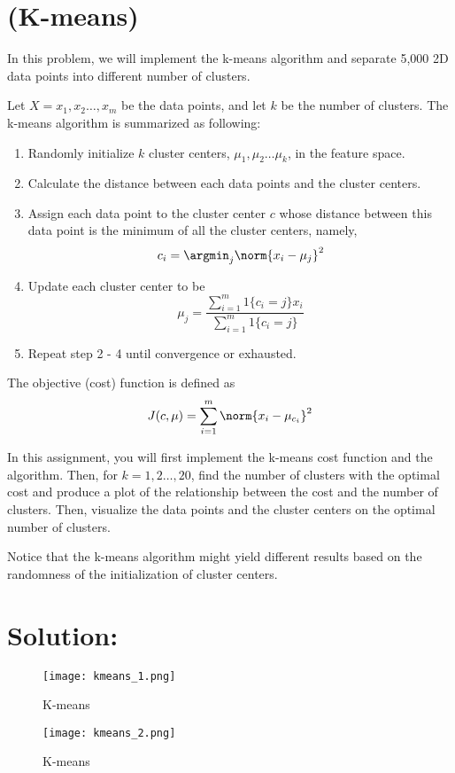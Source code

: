 \documentclass[189]{pset}
\begin{document}

  \section{(K-means)}
    In this problem, we will implement the k-means algorithm and
    separate 5,000 2D data points into different number of clusters.

    Let $X = {x_1, x_2 \ldots, x_m} $ be the data points, and let $k$
    be the number of clusters. The k-means algorithm is summarized as
    following:
    \begin{enumerate}[label=\arabic*.]
      \item Randomly initialize $k$ cluster centers, $\mu_1, \mu_2
        \ldots \mu_k$, in the feature space.
      \item Calculate the distance between each data points and the
        cluster centers.
      \item Assign each data point to the cluster center $c$ whose
        distance between this data point is the minimum of all the
        cluster centers, namely,
        \[
          c_i = \argmin_j \norm{x_i - \mu_j}^2
        \]
      \item Update each cluster center to be
        \[
          \mu_j = \frac{\sum_{i=1}^{m}1\{c_i = j\}x_i}{\sum_{i =
              1}^{m}1\{c_i = j\}}
        \]
      \item Repeat step 2 - 4 until convergence or exhausted.
    \end{enumerate}

    The objective (cost) function is defined as
    \[
      J(c, \mu) = \sum_{i = 1}^{m} \norm{x_i - \mu_{c_i}}^2
    \]

    In this assignment, you will first implement the k-means cost
    function and the algorithm. Then, for $k = 1, 2 \ldots, 20$, find
    the number of clusters with the optimal cost and produce a plot of
    the relationship between the cost and the number of clusters.
    Then, visualize the data points and the cluster centers on the
    optimal number of clusters.

    Notice that the k-means algorithm might yield different results
    based on the randomness of the initialization of cluster centers.

  \hrulefill

  \section*{Solution:}
  \begin{figure}[H]
    \centering
    \texttt{[image: kmeans\_1.png]}
    \caption{K-means}
    \label{fig:k-means}
  \end{figure}
  \begin{figure}[H]
    \centering
    \texttt{[image: kmeans\_2.png]}
    \caption{K-means}
    \label{fig:k-means}
  \end{figure}
\end{document}
